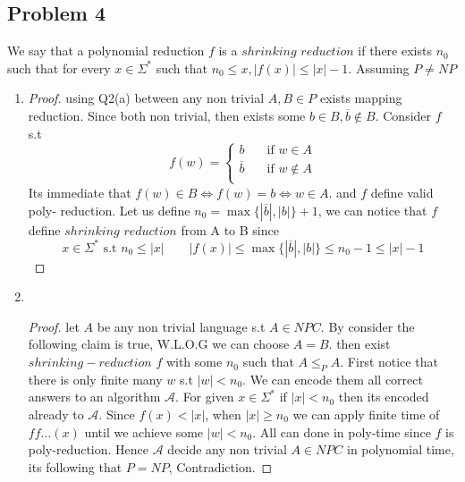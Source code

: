 \documentclass[12pt]{article}
\begin{document}
\subsection*{Problem 4} 
We say that a polynomial reduction $f$ is a $shrinking$ $reduction$ if there exists
$n_0$ such that for every $x\in \Sigma^*$
such that $n_0\le x , |f(x)|\le|x|-1$. Assuming $P\ne NP$
\begin{enumerate}[label=(\alph*)]
\item {}
\pagebreak\begin{proof}
using Q2(a) between any non trivial $A,B\in P$ exists mapping reduction. Since both non trivial, then exists some $b \in B,\overline{b}\notin B$. Consider $f$ s.t 
\[
f(w)=\begin{cases} 
      b &\quad\text{if  } w \in A \\
        \overline{b} &\quad\text{if  } w \notin A \\ \end{cases}  
     \]
     Its immediate that $f(w)\in B \Leftrightarrow f(w)=b \Leftrightarrow w\in A  $. and $f$ define valid poly- reduction. Let us define $n_0=\max \{|\overline{b}|,|b|\} +1$, we can notice that $f$ define $shrinking$ 
$reduction$ from A to B since
\[
x\in \Sigma^* \text{ s.t }n_0\le |x| \qquad |f(x)|\le \max \{|\overline{b}|,|b|\}\le n_0-1 \le |x|-1
\]
\end{proof}
\item {}
\\
\begin{proof}
let $A$ be any non trivial language s.t $A\in NPC$. By consider the following claim is true, W.L.O.G we can choose $A=B$. then exist  $shrinking 
-reduction$ $f$ with some $n_0$ such that $A\le_P A$. First notice that there is only finite many $w$ s.t $|w|< n_0$. We can encode them all correct answers   to an  algorithm $\mathcal{A}$.  For given $x\in \Sigma ^*$ if $|x|< n_0$ then its encoded already to $\mathcal{A}$. Since $f(x)<|x|$, when $|x|\ge  n_0$ we can apply finite time of $ff\dots (x)$  until we achieve  some $|w|<n_0$. All can done in poly-time since $f$ is poly-reduction. Hence $\mathcal{A}$ decide any non trivial $A\in NPC$ in polynomial time, its following that $P=NP$, Contradiction. 
 \end{proof}
\end{enumerate}
\end{document}
